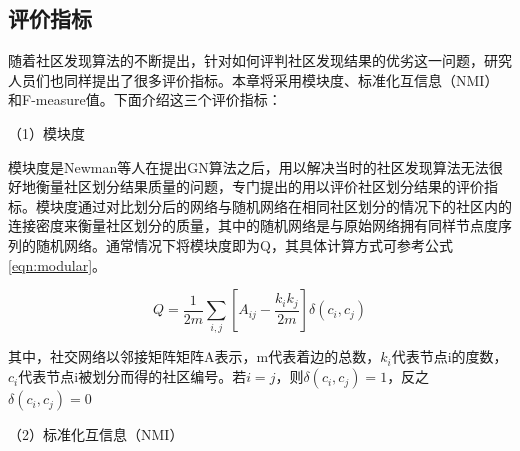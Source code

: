 \subsection{评价指标}

随着社区发现算法的不断提出，针对如何评判社区发现结果的优劣这一问题，研究人员们也同样提出了很多评价指标。本章将采用模块度、标准化互信息（NMI）和F-measure值。下面介绍这三个评价指标：

（1）模块度

模块度\cite{2002Community}是Newman等人在提出GN算法之后，用以解决当时的社区发现算法无法很好地衡量社区划分结果质量的问题，专门提出的用以评价社区划分结果的评价指标。模块度通过对比划分后的网络与随机网络在相同社区划分的情况下的社区内的连接密度来衡量社区划分的质量，其中的随机网络是与原始网络拥有同样节点度序列的随机网络。通常情况下将模块度即为Q，其具体计算方式可参考公式\ref{eqn:modular}。

\begin{equation}
  \label{eqn:modular}
  Q=\frac{1}{2m}\sum_{i,j}\left [ A_{ij}-\frac{k_ik_j}{2m} \right ]\delta (c_i, c_j)  
\end{equation}

其中，社交网络以邻接矩阵矩阵A表示，m代表着边的总数，$k_i$代表节点i的度数，$c_i$代表节点i被划分而得的社区编号。若$i=j$，则$\delta(c_i,c_j)=1$，反之$\delta(c_i,c_j)=0$

（2）标准化互信息（NMI）

